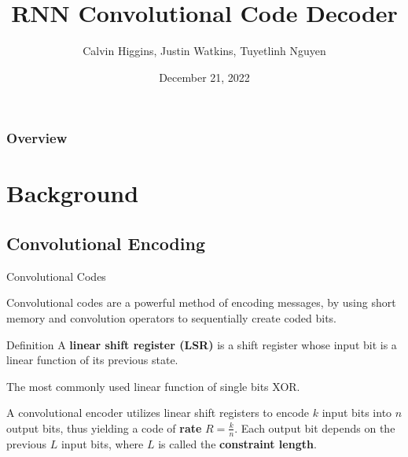 \documentclass{beamer}
\title[RNN Decoder]{RNN Convolutional Code Decoder} %
\author[C. Higgins, J. Watkins, T. Nguyen]{Calvin Higgins, Justin Watkins, Tuyetlinh Nguyen} %
\institute[URI] %
{
University of Rhode Island %
}
\date{December 21, 2022} %
\newcommand{\<}				{\langle}
\renewcommand{\>}      		{\rangle}
\begin{document}

\begin{frame}
\titlepage %
\end{frame}


\begin{frame}
\frametitle{Overview} 
\tableofcontents 
\end{frame}


\section{Background} 

\subsection{Convolutional Encoding} 

\begin{frame}{Convolutional Codes}

Convolutional codes are a powerful method of encoding messages, by using short memory and convolution operators to sequentially create coded bits. 

\medskip

\begin{block}{Definition}
A \textbf{linear shift register (LSR)} is a shift register whose input bit is a linear function of its previous state.

\smallskip

The most commonly used linear function of single bits XOR.
\end{block}

\medskip

A convolutional encoder utilizes linear shift registers to encode $k$ input bits into $n$ output bits, thus yielding a code of \textbf{rate} $R=\frac{k}{n}$. Each output bit depends on the previous $L$ input bits, where $L$ is called the \textbf{constraint length}.

\end{frame}
\end{document}
